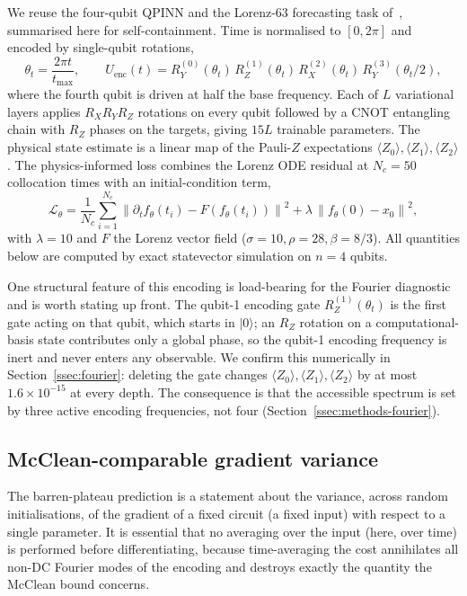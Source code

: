 \documentclass[a4paper,12pt]{iopart}
\providecommand{\norm}[1]{\left\lVert#1\right\rVert}
\newcommand{\Zexp}[1]{\langle Z_{#1}\rangle}
\begin{document}
We reuse the four-qubit QPINN and the Lorenz-63 forecasting task
of~\cite{pandey2604}, summarised here for self-containment. Time is normalised
to $[0,2\pi]$ and encoded by single-qubit rotations,
\begin{equation}
  \theta_t = \frac{2\pi t}{t_{\max}}, \qquad
  U_{\mathrm{enc}}(t) = R_Y^{(0)}(\theta_t)\,R_Z^{(1)}(\theta_t)\,
                        R_X^{(2)}(\theta_t)\,R_Y^{(3)}(\theta_t/2),
\end{equation}
where the fourth qubit is driven at half the base frequency. Each of $L$
variational layers applies $R_X R_Y R_Z$ rotations on every qubit followed by a
CNOT entangling chain with $R_Z$ phases on the targets, giving $15L$ trainable
parameters. The physical state estimate is a linear map of the Pauli-$Z$
expectations $\Zexp{0},\Zexp{1},\Zexp{2}$. The physics-informed loss combines
the Lorenz ODE residual at $N_c=50$ collocation times with an initial-condition
term,
\begin{equation}
  \mathcal{L}_\theta
    = \frac{1}{N_c}\sum_{i=1}^{N_c}
        \norm{\partial_t f_\theta(t_i) - F(f_\theta(t_i))}^2
    + \lambda\,\norm{f_\theta(0) - x_0}^2 ,
\end{equation}
with $\lambda=10$ and $F$ the Lorenz vector field
($\sigma=10,\rho=28,\beta=8/3$). All quantities below are computed by exact
statevector simulation on $n=4$ qubits.

One structural feature of this encoding is load-bearing for the Fourier
diagnostic and is worth stating up front. The qubit-1 encoding gate
$R_Z^{(1)}(\theta_t)$ is the first gate acting on that qubit, which starts in
$|0\rangle$; an $R_Z$ rotation on a computational-basis state contributes only a
global phase, so the qubit-1 encoding frequency is inert and never enters any
observable. We confirm this numerically in Section~\ref{ssec:fourier}: deleting
the gate changes $\Zexp{0},\Zexp{1},\Zexp{2}$ by at most $1.6\times10^{-15}$ at
every depth. The consequence is that the accessible spectrum is set by three
active encoding frequencies, not four (Section~\ref{ssec:methods-fourier}).

\subsection{McClean-comparable gradient variance}
\label{ssec:methods-variance}

The barren-plateau prediction is a statement about the variance, across random
initialisations, of the gradient of a fixed circuit (a fixed input) with respect
to a single parameter. It is essential that no averaging over the input (here,
over time) is performed before differentiating, because time-averaging the cost
annihilates all non-DC Fourier modes of the encoding and destroys exactly the
quantity the McClean bound concerns.
\end{document}
